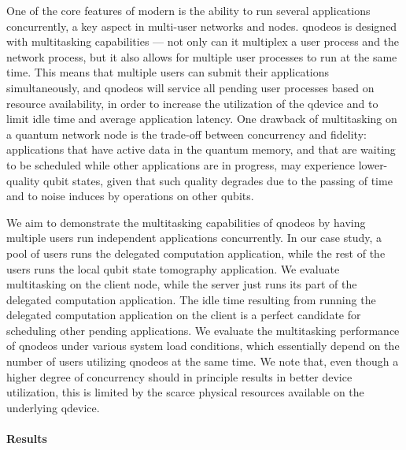 One of the core features of modern  is the ability to run several applications
concurrently, a key aspect in multi-user networks and nodes. \acrshort{qnodeos} is designed with
multitasking capabilities --- not only can it multiplex a user process and the network process, but
it also allows for multiple user processes to run at the same time. This means that multiple users
can submit their applications simultaneously, and \acrshort{qnodeos} will service all pending user
processes based on resource availability, in order to increase the utilization of the
\acrshort{qdevice} and to limit idle time and average application latency. One drawback of
multitasking on a quantum network node is the trade-off between concurrency and fidelity:
applications that have active data in the quantum memory, and that are waiting to be scheduled while
other applications are in progress, may experience lower-quality qubit states, given that such
quality degrades due to the passing of time and to noise induces by operations on other qubits.

We aim to demonstrate the multitasking capabilities of \acrshort{qnodeos} by having multiple users
run independent applications concurrently. In our case study, a pool of users runs the delegated
computation application, while the rest of the users runs the local qubit state tomography
application. We evaluate multitasking on the client node, while the server just runs its part of the
delegated computation application. The idle time resulting from running the delegated computation
application on the client is a perfect candidate for scheduling other pending applications. We
evaluate the multitasking performance of \acrshort{qnodeos} under various system load conditions,
which essentially depend on the number of users utilizing \acrshort{qnodeos} at the same time. We
note that, even though a higher degree of concurrency should in principle results in better device
utilization, this is limited by the scarce physical resources available on the underlying
\acrshort{qdevice}.

\paragraph{Results}

